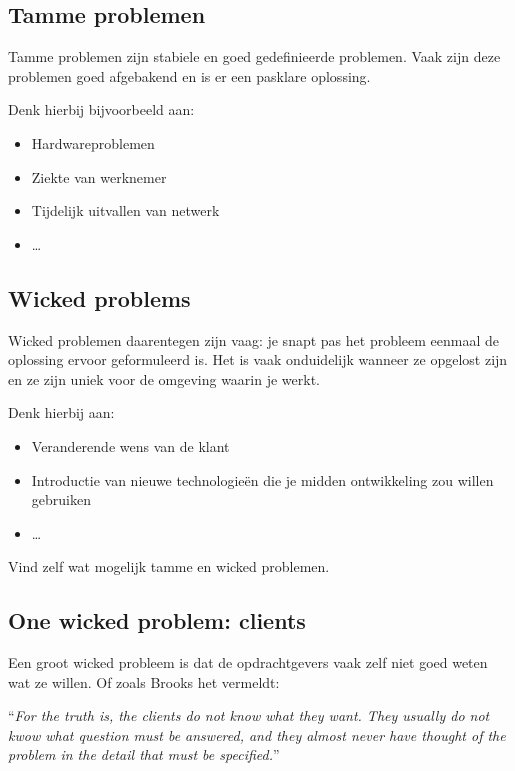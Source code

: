 \subsection{Tamme problemen}
Tamme problemen zijn stabiele en goed gedefinieerde problemen. Vaak zijn deze problemen goed afgebakend en is  er een pasklare oplossing.

Denk hierbij bijvoorbeeld aan:
\begin{itemize}
	\item Hardwareproblemen
	\item Ziekte van werknemer
	\item Tijdelijk uitvallen van netwerk
	\item \dots
\end{itemize}

\subsection{Wicked problems}
Wicked problemen daarentegen zijn vaag: je snapt pas het probleem eenmaal de oplossing ervoor geformuleerd is. Het is vaak onduidelijk wanneer ze opgelost zijn en ze zijn uniek voor de omgeving waarin je werkt. 

Denk hierbij aan:
\begin{itemize}
	\item Veranderende wens van de klant
	\item Introductie van nieuwe technologie\"en die je midden ontwikkeling zou willen gebruiken
	\item \dots
\end{itemize}

\begin{exercise}
	Vind zelf wat mogelijk tamme en wicked problemen.
\end{exercise}

\subsection{One wicked problem: clients}
Een groot wicked probleem is dat de opdrachtgevers vaak zelf niet goed weten wat ze willen. Of zoals Brooks het vermeldt:

\begin{center}
``\textit{For the truth is, the clients do not know what they want. They usually do not kwow what question must be answered, and they almost never have thought of the problem in the detail that must be specified.}''
\end{center}

